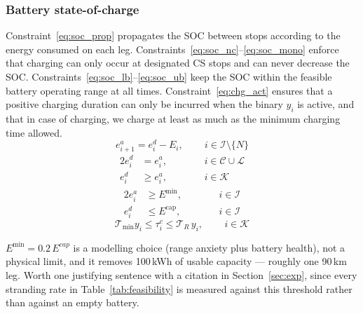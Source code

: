 \subsubsection{Battery state-of-charge}
Constraint~\eqref{eq:soc_prop} propagates the SOC between stops according to the energy consumed on each leg. Constraints~\eqref{eq:soc_nc}--\eqref{eq:soc_mono} enforce that charging can only occur at designated CS stops and can never decrease the SOC. Constraints~\eqref{eq:soc_lb}--\eqref{eq:soc_ub} keep the SOC within the feasible battery operating range at all times. Constraint~\eqref{eq:chg_act} ensures that a positive charging duration can only be incurred when the binary $y_i$ is active, and that in case of charging, we charge at least as much as the minimum charging time allowed.
\begin{equation}
    e_{i+1}^a = e_i^d - E_i, \qquad \, i \in \mathcal{I}\setminus\{N\} \label{eq:soc_prop}
\end{equation}
\begin{alignat}{2}
    e_i^d &= e_i^a, &\qquad& \, i \in \mathcal{C} \cup \mathcal L \label{eq:soc_nc}\\
    e_i^d &\geq e_i^a, &\qquad& \, i \in \mathcal{K} \label{eq:soc_mono}
\end{alignat}
\begin{alignat}{2}
    e_i^a &\geq E^{\min}, &\qquad& \, i \in \mathcal{I} \label{eq:soc_lb}\\
    e_i^d &\leq E^{\mathrm{cap}}, &\qquad& \, i \in \mathcal{I} \label{eq:soc_ub}
\end{alignat}
\begin{equation}
    \mathcal{T}_{\text{min}} y_i \leq \tau_i^c \leq \mathcal{T}_R\, y_i, \qquad \, i \in \mathcal{K} \label{eq:chg_act}
\end{equation}

\begin{acmt}
$E^{\min} = 0.2\,E^{cap}$ is a modelling choice (range anxiety plus battery
health), not a physical limit, and it removes 100\,kWh of usable capacity ---
roughly one 90\,km leg. Worth one justifying sentence with a citation in
Section~\ref{sec:exp}, since every stranding rate in
Table~\ref{tab:feasibility} is measured against this threshold rather than
against an empty battery.
\end{acmt}

